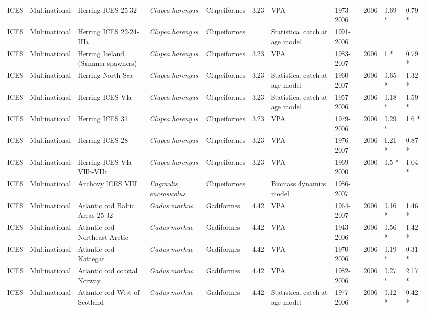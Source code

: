 \begin{longtable}{p{1.5cm}p{1.5cm}p{3cm}p{3cm}p{2.5cm}p{0.9cm}p{1.4cm}p{0.9cm}p{0.9cm}p{0.9cm}p{1cm}}
  ICES & Multinational & Herring ICES 25-32 & \textit{Clupea harengus} & Clupeiformes & 3.23 & VPA & 1973-2006 & 2006 & 0.69 * & 0.79 * \\ 
  ICES & Multinational & Herring ICES 22-24-IIIa & \textit{Clupea harengus} & Clupeiformes &  & Statistical catch at age model & 1991-2006 &  &  &  \\ 
  ICES & Multinational & Herring Iceland (Summer spawners) & \textit{Clupea harengus} & Clupeiformes & 3.23 & VPA & 1983-2007 & 2006 & 1 * & 0.79 * \\ 
  ICES & Multinational & Herring North Sea & \textit{Clupea harengus} & Clupeiformes & 3.23 & Statistical catch at age model & 1960-2007 & 2006 & 0.65 * & 1.32 * \\ 
  ICES & Multinational & Herring ICES VIa & \textit{Clupea harengus} & Clupeiformes & 3.23 & Statistical catch at age model & 1957-2006 & 2006 & 0.18 * & 1.59 * \\ 
  ICES & Multinational & Herring ICES 31 & \textit{Clupea harengus} & Clupeiformes & 3.23 & VPA & 1979-2006 & 2006 & 0.29 * & 1.6 * \\ 
  ICES & Multinational & Herring ICES 28 & \textit{Clupea harengus} & Clupeiformes & 3.23 & VPA & 1976-2007 & 2006 & 1.21 * & 0.87 * \\ 
  ICES & Multinational & Herring ICES VIa-VIIb-VIIc & \textit{Clupea harengus} & Clupeiformes & 3.23 & VPA & 1969-2000 & 2000 & 0.5 * & 1.04 * \\ 
  ICES & Multinational & Anchovy ICES VIII & \textit{Engraulis encrasicolus} & Clupeiformes &  & Biomass dynamics model & 1986-2007 &  &  &  \\ 
  ICES & Multinational & Atlantic cod Baltic Areas 25-32 & \textit{Gadus morhua} & Gadiformes & 4.42 & VPA & 1964-2007 & 2006 & 0.16 * & 1.46 * \\ 
  ICES & Multinational & Atlantic cod Northeast Arctic & \textit{Gadus morhua} & Gadiformes & 4.42 & VPA & 1943-2006 & 2006 & 0.56 * & 1.42 * \\ 
  ICES & Multinational & Atlantic cod Kattegat & \textit{Gadus morhua} & Gadiformes & 4.42 & VPA & 1970-2006 & 2006 & 0.19 * & 0.31 * \\ 
  ICES & Multinational & Atlantic cod coastal Norway & \textit{Gadus morhua} & Gadiformes & 4.42 & VPA & 1982-2006 & 2006 & 0.27 * & 2.17 * \\ 
  ICES & Multinational & Atlantic cod West of Scotland & \textit{Gadus morhua} & Gadiformes & 4.42 & Statistical catch at age model & 1977-2006 & 2006 & 0.12 * & 0.42 * \\ 

\end{longtable}
